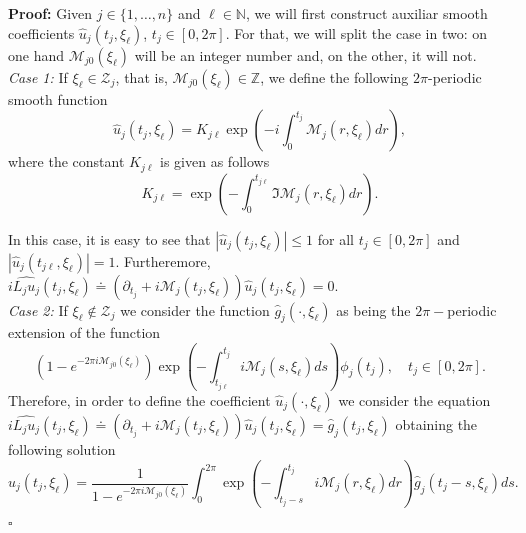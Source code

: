 \documentclass[12pt]{elsarticle}
\numberwithin{equation}{section}
\newenvironment{proof}[1][\noindent \textbf{Proof: }]{#1}{ \hfill $\square$ \vspace{2mm}}
\begin{document}
\begin{proof}
	Given $j\in\{1,\ldots,n\}$ and $\ell\in\mathbb{N}$, we will first construct auxiliar smooth coefficients $\widehat{u}_j(t_j,\xi_{\ell})$, $t_j\in[0,2\pi]$. For that, we will split the case in two: on one hand
	$\mathcal{M}_{j0}(\xi_{\ell})$ will be an integer number  and, on the other, it will not.\\
	
	
	
	
	{\it Case 1:} If $\xi_{\ell}\in \mathcal{Z}_j$, that is, $\mathcal{M}_{j0}(\xi_{\ell})\in\mathbb{Z}$, we define the following $2\pi$-periodic smooth function  
	$$
	\widehat{u}_j(t_j,\xi_{\ell})=K_{j\ell} \exp\left(-i\int_{0}^{t_j}\mathcal{M}_j(r,\xi_{\ell})dr\right),
	$$
	where the constant $K_{j\ell}$ is given as follows
	$$
	K_{j\ell}= \exp\left(-\int_{0}^{t_{j\ell}}\Im\mathcal{M}_j(r,\xi_{\ell})dr\right).
	$$
	
	In this case, it is easy to see that $|\widehat{u}_j(t_j,\xi_{\ell})|\leq 1$ for all $t_j\in[0,2\pi]$ and $|\widehat{u}_j(t_{j\ell},\xi_{\ell})|=1$.
	Furtheremore,  $i\widehat{L_j u_j}(t_j,\xi_\ell)\doteq(\partial_{t_j}+i\mathcal{M}_j(t_j,\xi_{\ell}))\widehat{u}_j(t_j,\xi_{\ell}) 
	=0$.\\
	
	
	
	{\it Case 2:} If $\xi_{\ell}\notin \mathcal{Z}_j$ we consider the function 
	$\widehat{g}_j(\cdot,\xi_\ell)$ as being the $2\pi-$periodic extension of the function 
	$$
	\left(1-e^{-2\pi i\mathcal{M}_{j0}(\xi_\ell)}\right)\exp\left(-\int_{t_{j\ell}}^{t_j}i\mathcal{M}_j(s,\xi_\ell)ds\right)\phi_j(t_j), \quad t_j\in[0,2\pi ].
	$$
	Therefore, in order to define the coefficient $\widehat{u}_j(\cdot,\xi_{\ell})$ we consider the equation $i\widehat{L_j u_j}(t_j,\xi_\ell)\doteq(\partial_{t_j}+i\mathcal{M}_j(t_j,\xi_{\ell}))\widehat{u}_j(t_j,\xi_{\ell}) 
	=\widehat{g}_j(t_j,\xi_\ell)$
	obtaining the following solution 
	$$
	\widehat{u}_j(t_j,\xi_\ell)= \dfrac{1}{1-e^{-2\pi i\mathcal{M}_{j0}(\xi_\ell)}}\int_{0}^{2\pi}\exp\left(-\int_{t_j-s}^{t_j}i\mathcal{M}_j(r,\xi_\ell)dr\right)\widehat{g}_j(t_j-s,\xi_\ell)ds.
	$$
	

\end{proof}
\end{document}
